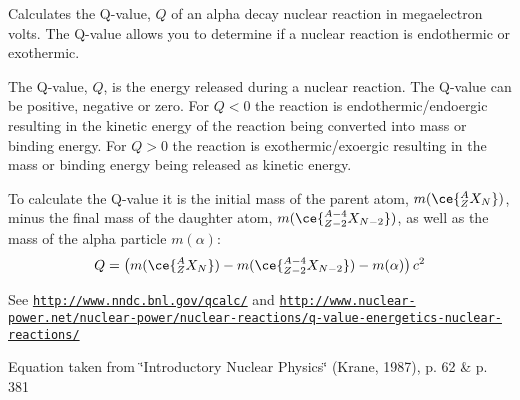 Calculates the Q-\/value, $Q$ of an alpha decay nuclear reaction in megaelectron volts. The Q-\/value allows you to determine if a nuclear reaction is endothermic or exothermic. 

The Q-\/value, $Q$, is the energy released during a nuclear reaction. The Q-\/value can be positive, negative or zero. For $Q < 0$ the reaction is endothermic/endoergic resulting in the kinetic energy of the reaction being converted into mass or binding energy. For $Q > 0$ the reaction is exothermic/exoergic resulting in the mass or binding energy being released as kinetic energy.

To calculate the Q-\/value it is the initial mass of the parent atom, $m(\ce{ ^{A}_{Z}X_{N} })$, minus the final mass of the daughter atom, $m(\ce{ ^{A-4}_{Z-2}X_{N-2} })$, as well as the mass of the alpha particle $m(\alpha)$\+: \[Q = \left ( m(\ce{ ^{A}_{Z}X_{N} })-m(\ce{ ^{A-4}_{Z-2}X_{N-2} })-m(\alpha) \right) c^2\]

See \href{http://www.nndc.bnl.gov/qcalc/}{\tt http\+://www.\+nndc.\+bnl.\+gov/qcalc/} and \href{http://www.nuclear-power.net/nuclear-power/nuclear-reactions/q-value-energetics-nuclear-reactions/}{\tt http\+://www.\+nuclear-\/power.\+net/nuclear-\/power/nuclear-\/reactions/q-\/value-\/energetics-\/nuclear-\/reactions/}

Equation taken from \char`\"{}\+Introductory Nuclear Physics\char`\"{} (Krane, 1987), p. 62 \& p. 381



